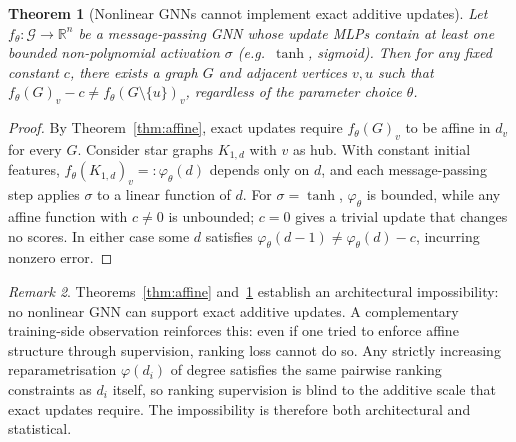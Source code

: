 \documentclass[11pt]{article}
\theoremstyle{plain}
\newtheorem{theorem}{Theorem}[section]
\theoremstyle{definition}
\theoremstyle{remark}
\newtheorem{remark}[theorem]{Remark}
\begin{document}
\begin{theorem}[Nonlinear GNNs cannot implement exact additive updates]
  \label{thm:nonlinear}
  Let $f_\theta : \mathcal{G} \to \mathbb{R}^n$ be a message-passing GNN whose
  update MLPs contain at least one bounded non-polynomial activation $\sigma$
  (e.g.\ $\tanh$, sigmoid). Then for any fixed constant $c$, there exists a graph
  $G$ and adjacent vertices $v, u$ such that $f_\theta(G)_v - c \neq
  f_\theta(G \setminus \{u\})_v$, regardless of the parameter choice $\theta$.
\end{theorem}
\begin{proof}
  By Theorem~\ref{thm:affine}, exact updates require $f_\theta(G)_v$ to be affine
  in $d_v$ for every $G$. Consider star graphs $K_{1,d}$ with $v$ as hub. With
  constant initial features, $f_\theta(K_{1,d})_v =: \varphi_\theta(d)$ depends
  only on $d$, and each message-passing step applies $\sigma$ to a linear function
  of $d$. For $\sigma = \tanh$, $\varphi_\theta$ is bounded, while any affine
  function with $c \neq 0$ is unbounded; $c = 0$ gives a trivial update that changes
  no scores. In either case some $d$ satisfies $\varphi_\theta(d-1) \neq
  \varphi_\theta(d) - c$, incurring nonzero error.
\end{proof}

\begin{remark}
  Theorems~\ref{thm:affine} and~\ref{thm:nonlinear} establish an architectural
  impossibility: no nonlinear GNN can support exact additive updates. A complementary
  training-side observation reinforces this: even if one tried to enforce affine
  structure through supervision, ranking loss cannot do so. Any strictly increasing
  reparametrisation $\varphi(d_i)$ of degree satisfies the same pairwise ranking
  constraints as $d_i$ itself, so ranking supervision is blind to the additive scale
  that exact updates require. The impossibility is therefore both architectural and
  statistical.
\end{remark}
\end{document}
